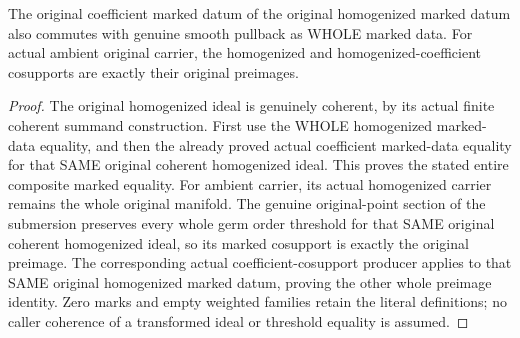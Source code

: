 \begin{theorem}\label{hir:submersion-actual-homogenized-coefficient-cosupport}
The original coefficient marked datum of the original homogenized marked datum
also commutes with genuine smooth pullback as WHOLE marked data. For actual
ambient original carrier, the homogenized and homogenized-coefficient cosupports
are exactly their original preimages.
\leanok
{}
\end{theorem}
\begin{proof}
The original homogenized ideal is genuinely coherent, by its actual finite
coherent summand construction. First use the WHOLE homogenized marked-data
equality, and then the already proved actual coefficient marked-data equality
for that SAME original coherent homogenized ideal. This proves the stated entire
composite marked equality. For ambient carrier, its actual homogenized carrier
remains the whole original manifold. The genuine original-point section of the
submersion preserves every whole germ order threshold for that SAME original
coherent homogenized ideal, so its marked cosupport is exactly the original
preimage. The corresponding actual coefficient-cosupport producer applies to
that SAME original homogenized marked datum, proving the other whole preimage
identity. Zero marks and empty weighted families retain the literal definitions;
no caller coherence of a transformed ideal or threshold equality is assumed.
\end{proof}
